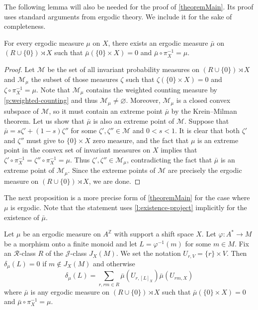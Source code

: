 \documentclass[a4paper,UKenglish,numberwithinsect,cleveref]{lipics-v2021}
\newcommand{\JJ}{\mathrel{\mathscr{J}}}
\newcommand{\RR}{\mathrel{\mathscr{R}}}
\newcommand{\Z}{\mathbb{Z}}
\begin{document}
The following lemma will also be needed for the proof of \cref{theoremMain}. Its proof uses standard arguments from ergodic theory. We include it for the sake of completeness.

\begin{lemma}\label{l:existence-project}
    For every ergodic measure $\mu$ on $X$, there exists an ergodic measure $\bar\mu$ on $(R\cup\{0\})\rtimes X$ such that $\bar\mu(\{0\}\times X) = 0$ and $\bar\mu\circ\pi_X^{-1}=\mu$.
\end{lemma}

\begin{proof}
    Let $\mathcal{M}$ be the set of all invariant probability measures on $(R\cup\{0\})\rtimes X$ and $\mathcal{M}_\mu$ the subset of those measures $\zeta$ such that $\zeta(\{0\}\times X)=0 $ and $\zeta\circ\pi_X^{-1} = \mu$. Note that $\mathcal{M}_\mu$ contains the weighted counting measure by \cref{p:weighted-counting} and thus $\mathcal{M}_\mu \neq\varnothing$. Moreover, $\mathcal{M}_\mu$ is a closed convex subspace of $\mathcal{M}$, so it must contain an extreme point $\bar\mu$ by the Krein--Milman theorem. Let us show that $\bar\mu$ is also an extreme point of $\mathcal{M}$. Suppose that $\bar\mu = s\zeta'+(1-s)\zeta''$ for some $\zeta',\zeta''\in\mathcal{M}$ and $0<s<1$. It is clear that both $\zeta'$ and $\zeta''$ must give  to $\{0\}\times X$ zero measure, and the fact that $\mu$ is an extreme point in the convex set of invariant measures on $X$ implies that $\zeta'\circ\pi_X^{-1}=\zeta''\circ\pi_X^{-1}=\mu$. Thus $\zeta',\zeta''\in\mathcal{M}_\mu$, contradicting the fact that $\bar\mu$ is an extreme point of $\mathcal{M}_\mu$. Since the extreme points of $\mathcal{M}$ are precisely the ergodic measure on $(R\cup\{0\})\rtimes X$, we are done. 
\end{proof}

The next proposition is a more precise form of \cref{theoremMain} for the case where $\mu$ is ergodic. Note that the statement uses \cref{l:existence-project} implicitly
for the existence of $\bar\mu$.
\begin{proposition}\label{propositionDensityMonoid} 
    Let $\mu$ be an ergodic measure on $A^\Z$ with support a shift space $X$. Let $\varphi\colon A^*\to M$ be a morphism onto a finite monoid and let $L=\varphi^{-1}(m)$ for some $m\in M$.  Fix an $\RR$-class $R$ of the $\JJ$-class $J_X(M)$. We set  the notation $U_{r,V}=\{r\}\times V$. Then $\delta_\mu(L)=0$ if $m\notin J_X(M)$ and otherwise
    \begin{equation}
        \delta_\mu(L)= \sum_{r,rm\in R}\bar\mu(U_{r,[L]_X})\bar\mu(U_{rm,X})
        \label{eqDensityRationalLanguage}
    \end{equation}
    where $\bar\mu$ is any ergodic measure on $(R\cup\{0\})\rtimes X$ such that $\bar\mu(\{0\}\times X)=0$ and $\bar\mu\circ\pi_X^{-1} = \mu$.
\end{proposition}
\end{document}
